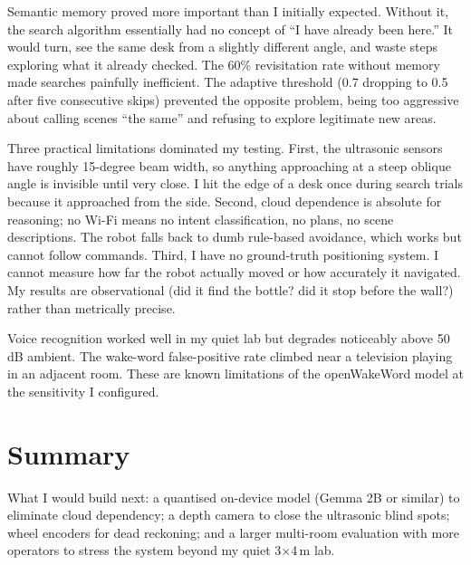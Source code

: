 Semantic memory proved more important than I initially expected. Without it, the search algorithm essentially had no concept of ``I have already been here.'' It would turn, see the same desk from a slightly different angle, and waste steps exploring what it already checked. The 60\% revisitation rate without memory made searches painfully inefficient. The adaptive threshold (0.7 dropping to 0.5 after five consecutive skips) prevented the opposite problem, being too aggressive about calling scenes ``the same'' and refusing to explore legitimate new areas.

Three practical limitations dominated my testing. First, the ultrasonic sensors have roughly 15-degree beam width, so anything approaching at a steep oblique angle is invisible until very close. I hit the edge of a desk once during search trials because it approached from the side. Second, cloud dependence is absolute for reasoning; no Wi-Fi means no intent classification, no plans, no scene descriptions. The robot falls back to dumb rule-based avoidance, which works but cannot follow commands. Third, I have no ground-truth positioning system. I cannot measure how far the robot actually moved or how accurately it navigated. My results are observational (did it find the bottle? did it stop before the wall?) rather than metrically precise.

Voice recognition worked well in my quiet lab but degrades noticeably above 50\,dB ambient. The wake-word false-positive rate climbed near a television playing in an adjacent room. These are known limitations of the openWakeWord model at the sensitivity I configured.

\section{Summary}
\label{sec:ch8summary}

What I would build next: a quantised on-device model (Gemma 2B or similar) to eliminate cloud dependency; a depth camera to close the ultrasonic blind spots; wheel encoders for dead reckoning; and a larger multi-room evaluation with more operators to stress the system beyond my quiet 3$\times$4\,m lab.
